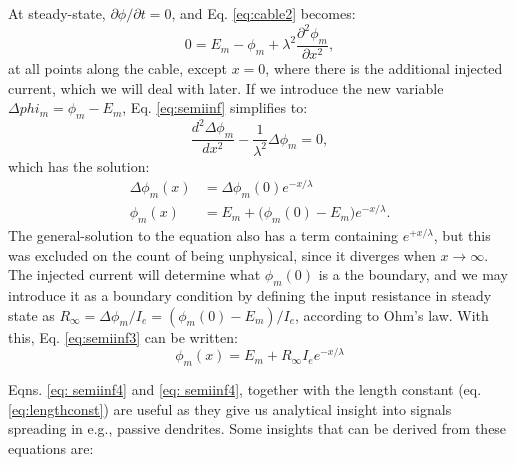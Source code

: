 At steady-state, $\partial \phi/\partial t = 0$, and Eq. \ref{eq:cable2} becomes:
\begin{equation}
0 = E_m-\phi_m +  \lambda^2 \frac{\partial^2 \phi_m}{\partial x^2}, 
\label{eq:semiinf}
\end{equation}
at all points along the cable, except $x=0$, where there is the additional injected current, which we will deal with later. If we introduce the new variable $\Delta{phi_m}=\phi_m-E_m$, Eq. \ref{eq:semiinf} simplifies to:
\begin{equation}
\frac{d^2 \Delta{\phi_m}}{d x^2} -  \frac{1}{\lambda^2} \Delta{\phi_m}=0, 
\label{eq:semiinf2}
\end{equation}
which has the solution:
\begin{align}
\Delta{\phi_m}(x) &= \Delta{\phi_m}(0) e^{-x/\lambda} \\
\phi_m(x) &= E_m + \big( \phi_m(0)-E_m \big) e^{-x/\lambda}.
\label{eq:semiinf3}
\end{align}
The general-solution to the equation also has a term containing $e^{+x/\lambda}$, but this was excluded on the count of being unphysical, since it diverges when $x \rightarrow \infty$. The injected current will determine what $\phi_m(0)$ is a the boundary, and we may introduce it as a boundary condition by defining the input resistance in steady state as $R_{\infty} =  \Delta \phi_m/I_e =  (\phi_m(0)-E_m)/I_e$, according to Ohm's law. With this, Eq. \ref{eq:semiinf3} can be written:
\begin{equation}
\phi_m(x) = E_m + R_{\infty} I_e e^{-x/\lambda}
\label{eq:semiinf4}
\end{equation}

Eqns. \ref{eq: semiinf4} and \ref{eq: semiinf4}, together with the length constant (eq. \ref{eq:lengthconst}) are useful as they give us analytical insight into signals spreading in e.g., passive dendrites. Some insights that can be derived from these equations are:

